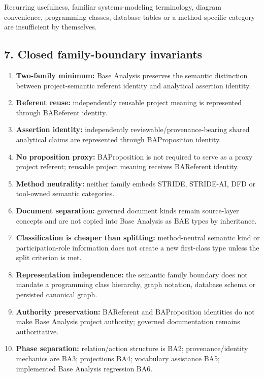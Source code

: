 \documentclass[
  10pt,
  a4paper,
]{article}
\providecommand{\tightlist}{%
  \setlength{\itemsep}{0pt}\setlength{\parskip}{0pt}}
\begin{document}
Recurring usefulness, familiar systems-modeling terminology, diagram
convenience, programming classes, database tables or a method-specific
category are insufficient by themselves.

\subsection{7. Closed family-boundary
invariants}\label{closed-family-boundary-invariants}

\begin{enumerate}
\def\labelenumi{\arabic{enumi}.}
\tightlist
\item
  \textbf{Two-family minimum:} Base Analysis preserves the semantic
  distinction between project-semantic referent identity and analytical
  assertion identity.
\item
  \textbf{Referent reuse:} independently reusable project meaning is
  represented through BAReferent identity.
\item
  \textbf{Assertion identity:} independently
  reviewable/provenance-bearing shared analytical claims are represented
  through BAProposition identity.
\item
  \textbf{No proposition proxy:} BAProposition is not required to serve
  as a proxy project referent; reusable project meaning receives
  BAReferent identity.
\item
  \textbf{Method neutrality:} neither family embeds STRIDE, STRIDE-AI,
  DFD or tool-owned semantic categories.
\item
  \textbf{Document separation:} governed document kinds remain
  source-layer concepts and are not copied into Base Analysis as BAE
  types by inheritance.
\item
  \textbf{Classification is cheaper than splitting:} method-neutral
  semantic kind or participation-role information does not create a new
  first-class type unless the split criterion is met.
\item
  \textbf{Representation independence:} the semantic family boundary
  does not mandate a programming class hierarchy, graph notation,
  database schema or persisted canonical graph.
\item
  \textbf{Authority preservation:} BAReferent and BAProposition
  identities do not make Base Analysis project authority; governed
  documentation remains authoritative.
\item
  \textbf{Phase separation:} relation/action structure is BA2;
  provenance/identity mechanics are BA3; projections BA4; vocabulary
  assistance BA5; implemented Base Analysis regression BA6.
\end{enumerate}
\end{document}
